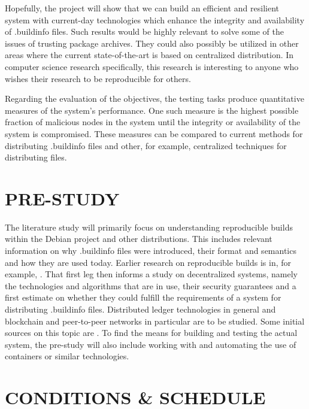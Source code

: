 \documentclass{article}
\begin{document}
Hopefully, the project will show that we can build an efficient and resilient system with current-day technologies which enhance the integrity and availability of .buildinfo files. Such results would be highly relevant to solve some of the issues of trusting package archives. They could also possibly be utilized in other areas where the current state-of-the-art is based on centralized distribution. In computer science research specifically, this research is interesting to anyone who wishes their research to be reproducible for others.

Regarding the evaluation of the objectives, the testing tasks produce quantitative measures of the system's performance. One such measure is the highest possible fraction of malicious nodes in the system until the integrity or availability of the system is compromised. These measures can be compared to current methods for distributing .buildinfo files and other, for example, centralized techniques for distributing files. 

\section*{PRE-STUDY}

The literature study will primarily focus on understanding reproducible builds within the Debian project and other distributions. This includes relevant information on why .buildinfo files were introduced, their format and semantics and how they are used today. Earlier research on reproducible builds is in, for example, \cite{linderud_reproducible_nodate,lamb_reproducible_2021}. That first leg then informs a study on decentralized systems, namely the technologies and algorithms that are in use, their security guarantees and a first estimate on whether they could fulfill the requirements of a system for distributing .buildinfo files. Distributed ledger technologies in general and blockchain and peer-to-peer networks in particular are to be studied. Some initial sources on this topic are \cite{daniel_ipfs_2022, blahser_thine_2021, ince_blockchain_2020,liu_data_2018,zahed_benisi_blockchain-based_2020}. To find the means for building and testing the actual system, the pre-study will also include working with and automating the use of containers or similar technologies.

\section*{CONDITIONS \& SCHEDULE}
\end{document}
